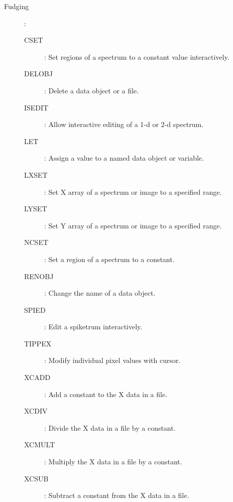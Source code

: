 \begin {description}
\begin{description}
\item [Fudging]\hspace{-1.5mm}:
\begin{description}
\item [CSET]: Set regions of a spectrum to a constant value interactively.
\item [DELOBJ]: Delete a data object or a file.
\item [ISEDIT]: Allow interactive editing of a 1-d or 2-d spectrum.
\item [LET]: Assign a value to a named data object or variable.
\item [LXSET]: Set X array of a spectrum or image to a specified range.
\item [LYSET]: Set Y array of a spectrum or image to a specified range.
\item [NCSET]: Set a region of a spectrum to a constant.
\item [RENOBJ]: Change the name of a data object.
\item [SPIED]: Edit a spiketrum interactively.
\item [TIPPEX]: Modify individual pixel values with cursor.
\item [XCADD]: Add a constant to the X data in a file.
\item [XCDIV]: Divide the X data in a file by a constant.
\item [XCMULT]: Multiply the X data in a file by a constant.
\item [XCSUB]: Subtract a constant from the X data in a file.
\end{description}


\end{description}
\end{description}

